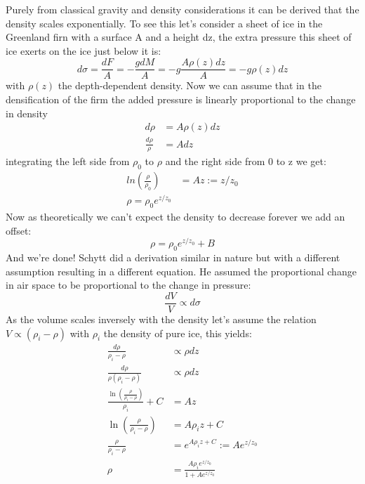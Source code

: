 \documentclass[11pt,a4paper,faculty=we,language=en,doctype=report]{cls/ugent-doc}
\begin{document}
Purely from classical gravity and density considerations it can be derived that
the density scales exponentially. To see this let's consider a sheet of ice in
the Greenland firn with a surface A and a height dz, the extra pressure this
sheet of ice exerts on the ice just below it is:
\begin{equation}
	d\sigma = \frac{dF}{A} = -\frac{gdM}{A} = -g\frac{A\rho(z)dz}{A} = -g\rho(z)dz
\end{equation}
with $\rho(z)$ the depth-dependent density. Now we can assume that in the
densification of the firm the added pressure is linearly proportional to the
change in density
\begin{align}
	d\rho &= A\rho(z)dz\\
	\frac{d\rho}{\rho} &= Adz
\end{align}
integrating the left side from $\rho_0$ to $\rho$ and the right side from 0 to z we get:
\begin{align}
ln\left(\frac{\rho}{\rho_0}\right) &= Az := z/z_0\\
	\rho = \rho_0 e^{z/z_0}
\end{align}
Now as theoretically we can't expect the density to decrease forever we add an offset:
\begin{equation}
	\label{eqn:myderiexp}
	\rho = \rho_0 e^{z/z_0} + B
\end{equation}
And we're done! Schytt did a derivation similar in nature but with a different
assumption resulting in a different equation. He assumed the proportional
change in air space to be proportional to the change in pressure:
\begin{equation}
	\frac{dV}{V} \propto d\sigma
\end{equation}
As the volume scales inversely with the density let's assume the relation $V \propto (\rho_i - \rho)$ with
$\rho_i$ the density of pure ice, this yields\cite{herron_langway_1980}:
\begin{align}
	\frac{d\rho}{\rho_i - \rho} &\propto \rho dz\\
	\frac{d\rho}{\rho(\rho_i - \rho)} &\propto \rho dz \label{eqn:SchyttEnd}\\
	\frac{\ln\left(\frac{\rho}{\rho_i-\rho}\right)}{\rho_i} + C &= Az\\
	\ln\left(\frac{\rho}{\rho_i-\rho}\right) &= A\rho_iz + C\\
	\frac{\rho}{\rho_i-\rho} &= e^{A\rho_iz + C} := Ae^{z/z_0}\\
	\rho &= \frac{A\rho_i e^{z/z_0}}{1 + Ae^{z/z_0}}
\end{align}
\end{document}
